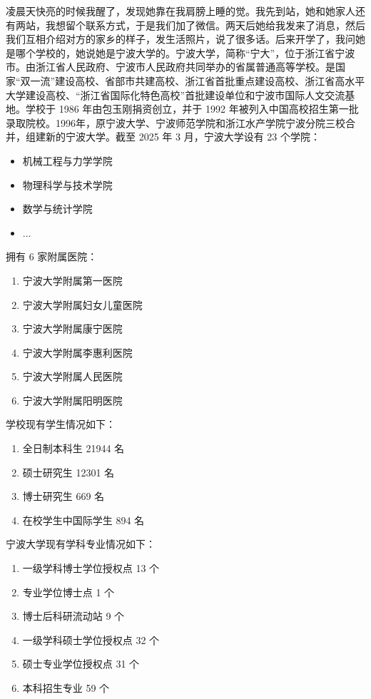 凌晨天快亮的时候我醒了，发现她靠在我肩膀上睡的觉。我先到站，她和她家人还有两站，我想留个联系方式，于是我们加了微信。两天后她给我发来了消息，然后我们互相介绍对方的家乡的样子，发生活照片，说了很多话。后来开学了，我问她是哪个学校的，她说她是宁波大学的。宁波大学，简称“宁大”，位于浙江省宁波市。由浙江省人民政府、宁波市人民政府共同举办的省属普通高等学校。是国家“双一流”建设高校、省部市共建高校、浙江省首批重点建设高校、浙江省高水平大学建设高校、“浙江省国际化特色高校”首批建设单位和宁波市国际人文交流基地。学校于 1986 年由包玉刚捐资创立，并于 1992 年被列入中国高校招生第一批录取院校。1996年，原宁波大学、宁波师范学院和浙江水产学院宁波分院三校合并，组建新的宁波大学。截至 2025 年 3 月，宁波大学设有 23 个学院：
\begin{itemize}
\item 机械工程与力学学院
\item 物理科学与技术学院
\item 数学与统计学院
\item ...
\end{itemize}
拥有 6 家附属医院：
\begin{enumerate}
 \item 宁波大学附属第一医院
 \item 宁波大学附属妇女儿童医院
 \item 宁波大学附属康宁医院
 \item 宁波大学附属李惠利医院
 \item 宁波大学附属人民医院
 \item 宁波大学附属阳明医院
\end{enumerate}
学校现有学生情况如下：
\begin{enumerate}[label=(\roman*)]
 \item 全日制本科生 21944 名
 \item 硕士研究生 12301 名
 \item 博士研究生 669 名
 \item 在校学生中国际学生 894 名
\end{enumerate}
宁波大学现有学科专业情况如下：
\begin{enumerate}[label=\alph*)]
 \item 一级学科博士学位授权点 13 个
 \item 专业学位博士点 1 个
 \item 博士后科研流动站 9 个
 \item 一级学科硕士学位授权点 32 个
 \item 硕士专业学位授权点 31 个
 \item 本科招生专业 59 个
\end{enumerate}
